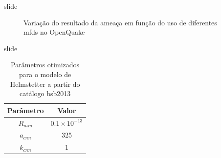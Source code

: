 \documentclass[ucs,8pt]{beamer}
\begin{document}
\begin{frame}{slide}
\begin{figure}[H]
\begin{subfigure}[t]{0.47\textheight}
		\label{fig:pga_woo_dif} 
	\end{subfigure}
	\caption{Variação do resultado da ameaça em função do uso de diferentes 
			\glspl{mfd} no OpenQuake}
	\label{fig:pga_woo} 
\end{figure}


\end{frame}



\begin{frame}{slide}

\begin{table}[H]
	\centering
	\begin{tabular}{c|c}
		Parâmetro & Valor \\ \hline
		$R_{min}$ & $0.1\times10^{-13}$ \\
		$a_{cnn}$ & 325 \\
		$k_{cnn}$ & 1 \\
	\end{tabular}
	\caption{Parâmetros otimizados para o modelo de Helmstetter a partir do catálogo \gls{bsb2013}}
	\label{tab:hemlstetter}
\end{table}

\end{frame}
\end{document}
